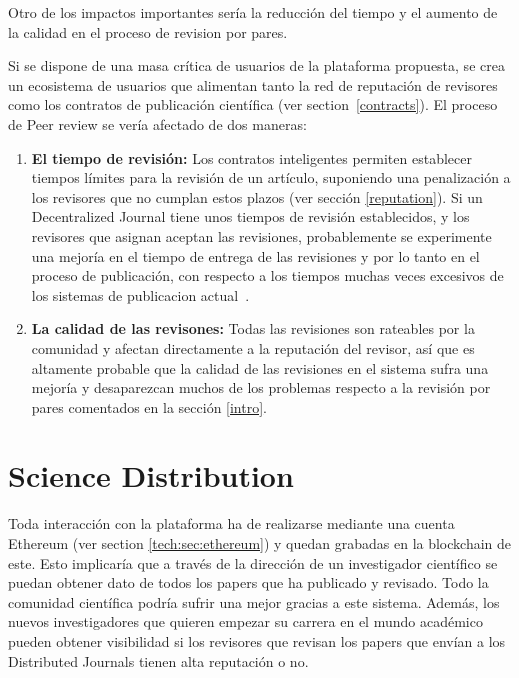 Otro de los impactos importantes sería la reducción del tiempo y el aumento de
la calidad en el proceso de revision por pares.

Si se dispone de una masa crítica de usuarios de la plataforma propuesta, se
crea un ecosistema de usuarios que alimentan tanto la red de reputación de
revisores como los contratos de publicación científica (ver
section~\ref{contracts}). El proceso de Peer review se vería afectado de dos
maneras:

\begin{enumerate}
\item \textbf{El tiempo de revisión:} Los contratos inteligentes permiten
  establecer tiempos límites para la revisión de un artículo, suponiendo una
  penalización a los revisores que no cumplan estos plazos (ver sección
  \ref{reputation}). Si un Decentralized Journal tiene unos tiempos de revisión
  establecidos, y los revisores que asignan aceptan las revisiones,
  probablemente se experimente una mejoría en el tiempo de entrega de las
  revisiones y por lo tanto en el proceso de publicación, con respecto a los
  tiempos muchas veces excesivos de los sistemas de publicacion
  actual~\cite{huisman2017duration}.
\item \textbf{La calidad de las revisones:} Todas las revisiones son rateables
  por la comunidad y afectan directamente a la reputación del revisor, así que
  es altamente probable que la calidad de las revisiones en el sistema sufra una
  mejoría y desaparezcan muchos de los problemas respecto a la revisión por
  pares comentados en la sección \ref{intro}.
\end{enumerate}

\section{Science Distribution}

Toda interacción con la plataforma ha de realizarse mediante una cuenta Ethereum
(ver section \ref{tech:sec:ethereum}) y quedan grabadas en la blockchain de
este. Esto implicaría que a través de la dirección de un investigador científico
se puedan obtener dato de todos los papers que ha publicado y revisado. Todo la
comunidad científica podría sufrir una mejor gracias a este sistema. Además, los
nuevos investigadores que quieren empezar su carrera en el mundo académico
pueden obtener visibilidad si los revisores que revisan los papers que envían a
los Distributed Journals tienen alta reputación o no.

